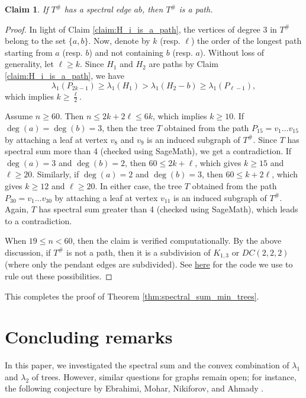 \documentclass[11pt]{article}
\theoremstyle{plain}
\newtheorem{claim}{Claim}[section]
\numberwithin{equation}{section}
\begin{document}
\begin{claim}
If $T^{\#}$ has a spectral edge $ab$, then $T^{\#}$ is a path.
\end{claim}

\begin{proof}
In light of Claim \ref{claim:H_i_is_a_path}, the vertices of degree 3 in $T^{\#}$ belong to the set $\{a,b\}$.
Now, denote by $k$ (resp. $\ell$) the order of the longest path starting from $a$ (resp. $b$) and not containing $b$ (resp. $a$). Without loss of generality, let $\ell \ge k$. Since $H_1$ and $H_2$ are paths by Claim \ref{claim:H_i_is_a_path}, we have 
\[\lambda_1(P_{2k-1})\ge \lambda_1(H_1) > \lambda_1(H_2 - b)\ge \lambda_1(P_{\ell-1}),\]
which implies $k\ge \frac{\ell}{2}$. 

Assume $n\ge 60$. Then $n \le 2k+ 2\ell \le 6k$, which implies $k\ge 10$. If $\deg(a)=\deg(b)=3$, then the tree $T$ obtained from the path $P_{15} = v_1\ldots v_{15}$ by attaching a leaf at vertex $v_8$ and $v_9$ is an induced subgraph of $T^{\#}$. Since $T$ has spectral sum more than 4 (checked using SageMath), we get a contradiction. If $\deg(a)=3$ and $\deg(b)=2$, then $60\le 2k+\ell$, which gives $k\ge 15$ and $\ell \ge 20$. Similarly, if $\deg(a)=2$ and $\deg(b)=3$, then $60\le k+2\ell$, which gives $k\ge 12$ and $\ell \ge 20$. In either case, the tree $T$ obtained from the path $P_{30} = v_1\ldots v_{30}$ by attaching a leaf at vertex $v_{11}$ is an induced subgraph of $T^{\#}$. Again, $T$ has spectral sum greater than 4 (checked using SageMath), which leads to a contradiction.

When $19\le n < 60$, then the claim is verified computationally. By the above discussion, if $T^{\#}$ is not a path, then it is a subdivision of $K_{1,3}$ or $DC(2,2,2)$ (where only the pendant edges are subdivided). See \href{https://github.com/Shivaramkratos/Codes_misc/blob/main/Spec_sum_minimize_check.sage}{here} for the code we use to rule out these possibilities. 
\end{proof}

This completes the proof of Theorem \ref{thm:spectral_sum_min_trees}. 

\section{Concluding remarks}
\label{section:conclusion}

In this paper, we investigated the spectral sum and the convex combination of $\lambda_1$ and $\lambda_2$ of trees. However, similar questions for graphs remain open; for instance, the following conjecture by Ebrahimi, Mohar, Nikiforov, and Ahmady \cite{Ebrahimi_Mohar_Nikiforov_Ahmady_2008}. 
\end{document}

